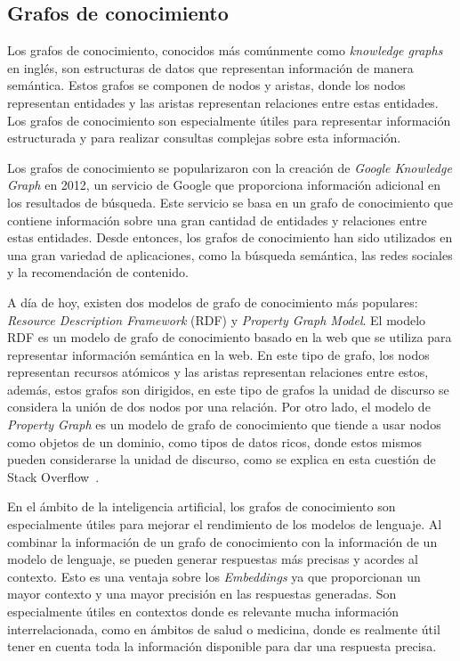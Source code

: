 \subsection{Grafos de conocimiento}
Los grafos de conocimiento, conocidos más comúnmente como \textit{knowledge graphs} en inglés, son estructuras de datos que representan información de manera semántica. Estos grafos se componen de nodos y aristas, donde los nodos representan entidades y las aristas representan relaciones entre estas entidades. Los grafos de conocimiento son especialmente útiles para representar información estructurada y para realizar consultas complejas sobre esta información.

Los grafos de conocimiento se popularizaron con la creación de \textit{Google Knowledge Graph} en 2012, un servicio de Google que proporciona información adicional en los resultados de búsqueda. Este servicio se basa en un grafo de conocimiento que contiene información sobre una gran cantidad de entidades y relaciones entre estas entidades. Desde entonces, los grafos de conocimiento han sido utilizados en una gran variedad de aplicaciones, como la búsqueda semántica, las redes sociales y la recomendación de contenido.

A día de hoy, existen dos modelos de grafo de conocimiento más populares: \textit{Resource Description Framework} (RDF) y \textit{Property Graph Model}. El modelo RDF es un modelo de grafo de conocimiento basado en la web que se utiliza para representar información semántica en la web. En este tipo de grafo, los nodos representan recursos atómicos y las aristas representan relaciones entre estos, además, estos grafos son dirigidos, en este tipo de grafos la unidad de discurso se considera la unión de dos nodos por una relación. Por otro lado, el modelo de \textit{Property Graph} es un modelo de grafo de conocimiento que tiende a usar nodos como objetos de un dominio, como tipos de datos ricos, donde estos mismos pueden considerarse la unidad de discurso, como se explica en esta cuestión de Stack Overflow~\cite{rdfVsPropertyGraph}.

En el ámbito de la inteligencia artificial, los grafos de conocimiento son especialmente útiles para mejorar el rendimiento de los modelos de lenguaje. Al combinar la información de un grafo de conocimiento con la información de un modelo de lenguaje, se pueden generar respuestas más precisas y acordes al contexto. Esto es una ventaja sobre los \textit{Embeddings} ya que proporcionan un mayor contexto y una mayor precisión en las respuestas generadas. Son especialmente útiles en contextos donde es relevante mucha información interrelacionada, como en ámbitos de salud o medicina, donde es realmente útil tener en cuenta toda la información disponible para dar una respuesta precisa.